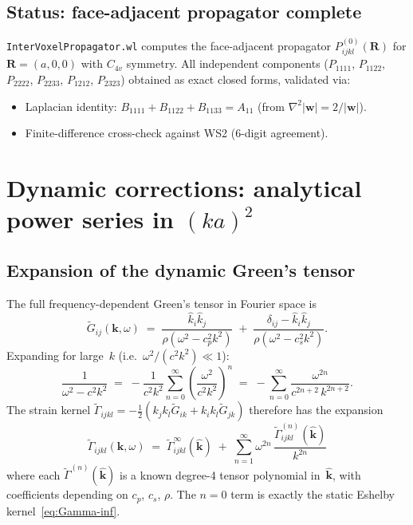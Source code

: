 \documentclass[11pt,a4paper]{article}
\newcommand{\bR}{\bm{R}}
\newcommand{\bk}{\bm{k}}
\newcommand{\bw}{\bm{w}}
\newcommand{\kh}{\hat{\bm{k}}}
\theoremstyle{plain}
\theoremstyle{remark}
\begin{document}
\subsection{Status: face-adjacent propagator complete}

\texttt{InterVoxelPropagator.wl} computes the face-adjacent
propagator $P^{(0)}_{ijkl}(\bR)$ for $\bR = (a,0,0)$ with $C_{4v}$
symmetry.  All independent components ($P_{1111}$, $P_{1122}$,
$P_{2222}$, $P_{2233}$, $P_{1212}$, $P_{2323}$) obtained as exact
closed forms, validated via:
\begin{itemize}[nosep]
  \item Laplacian identity:
    $B_{1111} + B_{1122} + B_{1133} = A_{11}$
    (from $\nabla^2|\bw| = 2/|\bw|$).
  \item Finite-difference cross-check against WS2 (6-digit agreement).
\end{itemize}


\section{Dynamic corrections: analytical power series in $(ka)^2$}
\label{sec:dynamic}

\subsection{Expansion of the dynamic Green's tensor}

The full frequency-dependent Green's tensor in Fourier space is
\begin{equation}
  \tilde{G}_{ij}(\bk,\omega) \;=\;
  \frac{\hat{k}_i\hat{k}_j}%
       {\rho(\omega^2 - c_p^2 k^2)}
  \;+\;
  \frac{\delta_{ij} - \hat{k}_i\hat{k}_j}%
       {\rho(\omega^2 - c_s^2 k^2)}.
  \label{eq:Gij-dynamic}
\end{equation}
Expanding for large~$k$ (i.e.\ $\omega^2/(c^2 k^2) \ll 1$):
\begin{equation}
  \frac{1}{\omega^2 - c^2 k^2}
  \;=\;
  -\frac{1}{c^2 k^2}
  \sum_{n=0}^{\infty}
  \left(\frac{\omega^2}{c^2 k^2}\right)^{\!n}
  \;=\;
  -\sum_{n=0}^{\infty}
  \frac{\omega^{2n}}{c^{2n+2}\,k^{2n+2}}.
  \label{eq:geometric-series}
\end{equation}
The strain kernel $\tilde{\Gamma}_{ijkl} = -\tfrac{1}{2}(k_j k_l
\tilde{G}_{ik} + k_i k_l \tilde{G}_{jk})$ therefore has the expansion
\begin{equation}
  \boxed{
  \tilde{\Gamma}_{ijkl}(\bk,\omega)
  \;=\;
  \tilde{\Gamma}^\infty_{ijkl}(\kh)
  \;+\;
  \sum_{n=1}^{\infty}
  \omega^{2n}\,
  \frac{\tilde{\Gamma}^{(n)}_{ijkl}(\kh)}{k^{2n}}
  }
  \label{eq:Gamma-expansion}
\end{equation}
where each $\tilde{\Gamma}^{(n)}(\kh)$ is a known degree-4 tensor
polynomial in~$\kh$, with coefficients depending on $c_p$, $c_s$,
$\rho$.  The $n=0$ term is exactly the static Eshelby
kernel~\eqref{eq:Gamma-inf}.
\end{document}
